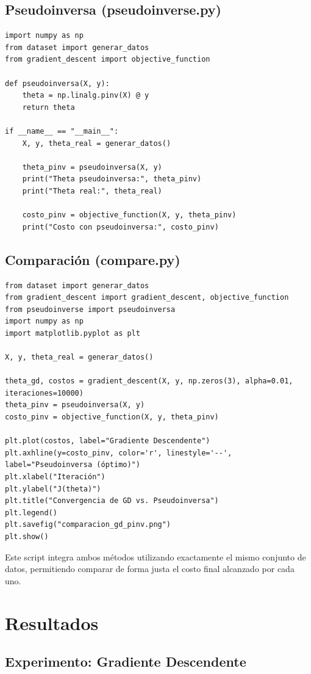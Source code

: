 \documentclass[11pt]{article}
\begin{document}
\subsection{Pseudoinversa (pseudoinverse.py)}
\begin{lstlisting}
import numpy as np
from dataset import generar_datos
from gradient_descent import objective_function

def pseudoinversa(X, y):
    theta = np.linalg.pinv(X) @ y
    return theta

if __name__ == "__main__":
    X, y, theta_real = generar_datos()

    theta_pinv = pseudoinversa(X, y)
    print("Theta pseudoinversa:", theta_pinv)
    print("Theta real:", theta_real)

    costo_pinv = objective_function(X, y, theta_pinv)
    print("Costo con pseudoinversa:", costo_pinv)
\end{lstlisting}

\subsection{Comparación (compare.py)}
\begin{lstlisting}
from dataset import generar_datos
from gradient_descent import gradient_descent, objective_function
from pseudoinverse import pseudoinversa
import numpy as np
import matplotlib.pyplot as plt

X, y, theta_real = generar_datos()

theta_gd, costos = gradient_descent(X, y, np.zeros(3), alpha=0.01, iteraciones=10000)
theta_pinv = pseudoinversa(X, y)
costo_pinv = objective_function(X, y, theta_pinv)

plt.plot(costos, label="Gradiente Descendente")
plt.axhline(y=costo_pinv, color='r', linestyle='--', label="Pseudoinversa (óptimo)")
plt.xlabel("Iteración")
plt.ylabel("J(theta)")
plt.title("Convergencia de GD vs. Pseudoinversa")
plt.legend()
plt.savefig("comparacion_gd_pinv.png")
plt.show()
\end{lstlisting}

Este script integra ambos métodos utilizando exactamente el mismo conjunto de datos, permitiendo comparar de forma justa el costo final alcanzado por cada uno.

\section{Resultados}

\subsection{Experimento: Gradiente Descendente}
\end{document}
